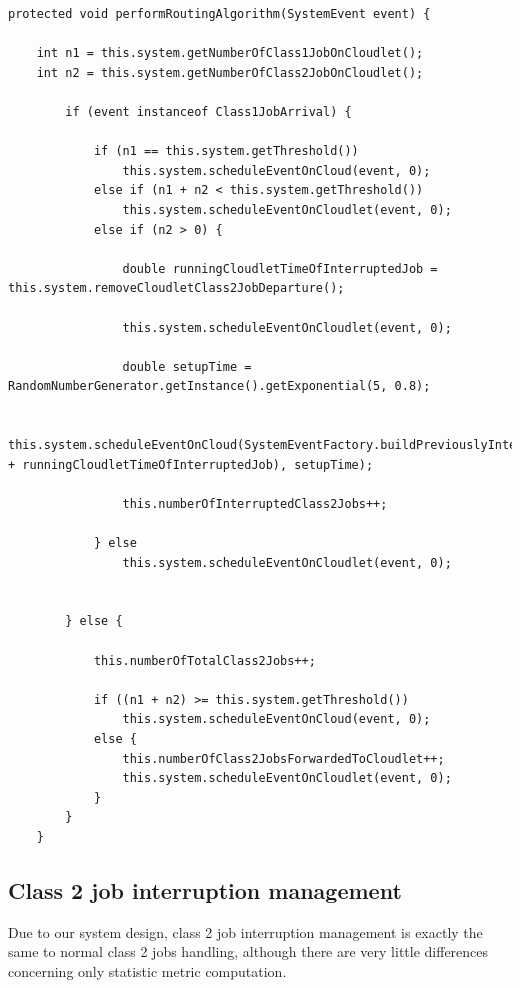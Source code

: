 \documentclass[10pt,a4paper]{article}
\begin{document}
\begin{lstlisting}[frame=lines, caption={\texttt{performRoutingAlgorithm} method implementation concerning access control algorithm 2.},label={code:performRoutingAlgorithm2}]
protected void performRoutingAlgorithm(SystemEvent event) {

    int n1 = this.system.getNumberOfClass1JobOnCloudlet();
    int n2 = this.system.getNumberOfClass2JobOnCloudlet();

        if (event instanceof Class1JobArrival) {

            if (n1 == this.system.getThreshold())
                this.system.scheduleEventOnCloud(event, 0);
            else if (n1 + n2 < this.system.getThreshold())
                this.system.scheduleEventOnCloudlet(event, 0);
            else if (n2 > 0) {

                double runningCloudletTimeOfInterruptedJob = this.system.removeCloudletClass2JobDeparture();

                this.system.scheduleEventOnCloudlet(event, 0);

                double setupTime = RandomNumberGenerator.getInstance().getExponential(5, 0.8);

                this.system.scheduleEventOnCloud(SystemEventFactory.buildPreviouslyInterruptedClass2JobArrival(setupTime + runningCloudletTimeOfInterruptedJob), setupTime);

                this.numberOfInterruptedClass2Jobs++;

            } else
                this.system.scheduleEventOnCloudlet(event, 0);


        } else {

            this.numberOfTotalClass2Jobs++;

            if ((n1 + n2) >= this.system.getThreshold())
                this.system.scheduleEventOnCloud(event, 0);
            else {
                this.numberOfClass2JobsForwardedToCloudlet++;
                this.system.scheduleEventOnCloudlet(event, 0);
            }
        }
    }
\end{lstlisting}

\subsection{Class 2 job interruption management}

Due to our system design, class 2 job interruption management is exactly the same to normal class 2 jobs handling, although there are very little differences concerning only statistic metric computation. 
\end{document}
